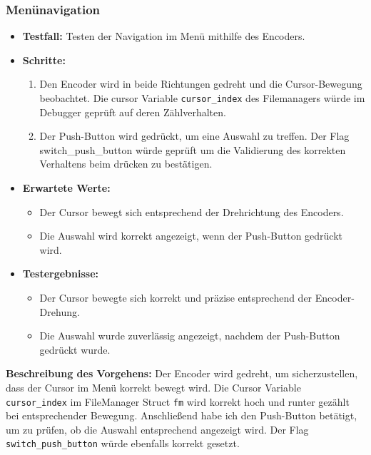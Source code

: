 \subsubsection{Menünavigation}
\begin{itemize}
	\item \textbf{Testfall:} Testen der Navigation im Menü mithilfe des Encoders.
	\item \textbf{Schritte:}
	\begin{enumerate}
		\item Den Encoder wird in beide Richtungen gedreht und die Cursor-Bewegung beobachtet. Die cursor Variable \texttt{cursor\_index} des Filemanagers würde im Debugger geprüft auf deren Zählverhalten.
		\item Der Push-Button wird gedrückt, um eine Auswahl zu treffen. Der Flag switch\_push\_button würde geprüft um die Validierung des korrekten Verhaltens beim drücken zu bestätigen.
	\end{enumerate}
	\item \textbf{Erwartete Werte:}
	\begin{itemize}
		\item Der Cursor bewegt sich entsprechend der Drehrichtung des Encoders.
		\item Die Auswahl wird korrekt angezeigt, wenn der Push-Button gedrückt wird.
	\end{itemize}
	
	\item \textbf{Testergebnisse:}
	\begin{itemize}
		\item Der Cursor bewegte sich korrekt und präzise entsprechend der Encoder-Drehung.
		\item Die Auswahl wurde zuverlässig angezeigt, nachdem der Push-Button gedrückt wurde.
	\end{itemize}
\end{itemize}

\textbf{Beschreibung des Vorgehens:} 
Der Encoder wird gedreht, um sicherzustellen, dass der Cursor im Menü korrekt bewegt wird. Die Cursor Variable \texttt{cursor\_index} im FileManager Struct \texttt{fm} wird korrekt hoch und runter gezählt bei entsprechender Bewegung. Anschließend habe ich den Push-Button betätigt, um zu prüfen, ob die Auswahl entsprechend angezeigt wird.  Der Flag \texttt{switch\_push\_button} würde ebenfalls korrekt gesetzt.